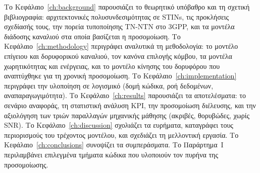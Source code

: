 Το Κεφάλαιο~\ref{ch:background} παρουσιάζει το θεωρητικό υπόβαθρο και τη
σχετική βιβλιογραφία: αρχιτεκτονικές πολυσυνδεσιμότητας σε STINs, τις
προκλήσεις σχεδίασής τους, την πορεία τυποποίησης TN-NTN στο 3GPP, και τα
μοντέλα διάδοσης καναλιού στα οποία βασίζεται η προσομοίωση. Το
Κεφάλαιο~\ref{ch:methodology} περιγράφει αναλυτικά τη μεθοδολογία: το
μοντέλο επίγειου και δορυφορικού καναλιού, τον κανόνα επιλογής κόμβου, τα
μοντέλα χωρητικότητας και ενέργειας, και το μοντέλο κίνησης του δορυφόρου
που αναπτύχθηκε για τη χρονική προσομοίωση. Το
Κεφάλαιο~\ref{ch:implementation} περιγράφει την υλοποίηση σε λογισμικό
(δομή κώδικα, ροή δεδομένων, αναπαραγωγιμότητα). Το
Κεφάλαιο~\ref{ch:results} παρουσιάζει τα αποτελέσματα: το σενάριο
αναφοράς, τη στατιστική ανάλυση KPI, την προσομοίωση διέλευσης, και την
αξιολόγηση των τριών παραλλαγών μηχανικής μάθησης (ακριβές, θορυβώδες,
χωρίς SNR). Το
Κεφάλαιο~\ref{ch:discussion} σχολιάζει τα ευρήματα, καταγράφει τους
περιορισμούς του τρέχοντος μοντέλου, και σχεδιάζει τη μελλοντική εργασία.
Το Κεφάλαιο~\ref{ch:conclusions} συνοψίζει τα συμπεράσματα. Το
Παράρτημα~Ι περιλαμβάνει επιλεγμένα τμήματα κώδικα που υλοποιούν τον
πυρήνα της προσομοίωσης.

